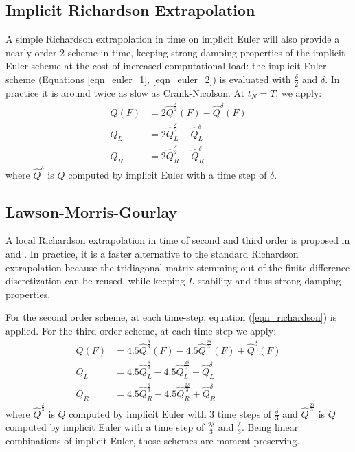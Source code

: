 \documentclass[]{rAMF2e}
\begin{document}
\subsection{Implicit Richardson Extrapolation}
A simple Richardson extrapolation in time \citep{richardson1911approximate} on implicit Euler will also provide a nearly order-2 scheme in time, keeping strong damping properties of the implicit Euler scheme at the cost of increased computational load: the implicit Euler scheme (Equations \ref{eqn_euler_1}, \ref{eqn_euler_2}) is evaluated with $\frac{\delta}{2}$ and $\delta$. In practice it is around twice as slow as Crank-Nicolson. At $t_N=T$, we apply:
\begin{align}\label{eqn_richardson}
Q(F) &= 2 \hat{Q}^{\frac{\delta}{2}}(F) - \hat{Q}^{\delta}(F) \\
Q_L &= 2 \hat{Q}^{\frac{\delta}{2}}_L - \hat{Q}^{\delta}_L\\
Q_R &= 2 \hat{Q}^{\frac{\delta}{2}}_R - \hat{Q}^{\delta}_R
\end{align}
where $\hat{Q}^{\delta}$ is $Q$ computed by implicit Euler with a time step of $\delta$.


\subsection{Lawson-Morris-Gourlay}
A local Richardson extrapolation in time of second and third order is proposed in \citep{lawson1978extrapolation} and \citep{gourlay1980extrapolation}. In practice, it is a faster alternative to the standard Richardson extrapolation because the tridiagonal matrix stemming out of the finite difference discretization can be reused, while keeping $L$-stability and thus strong damping properties.

For the second order scheme, at each time-step, equation (\ref{eqn_richardson}) is applied.
For the third order scheme, at each time-step we apply:
\begin{align}\label{eqn_lmg3}
Q(F) &= 4.5 \hat{Q}^{\frac{\delta}{3}}(F) - 4.5 \hat{Q}^{\frac{2\delta}{3}}(F)  + \hat{Q}^{\delta}(F)\\
Q_L &= 4.5 \hat{Q}^{\frac{\delta}{3}}_L - 4.5 \hat{Q}^{\frac{2\delta}{3}}_L  + \hat{Q}^{\delta}_L\\
Q_R &= 4.5 \hat{Q}^{\frac{\delta}{3}}_R - 4.5 \hat{Q}^{\frac{2\delta}{3}}_R  + \hat{Q}^{\delta}_R
\end{align}
where $\hat{Q}^{\frac{\delta}{3}}$ is $Q$ computed by implicit Euler with 3 time steps of $\frac{\delta}{3}$ and $\hat{Q}^{\frac{2\delta}{3}}$ is $Q$ computed by implicit Euler with a time step of $\frac{2\delta}{3}$ and $\frac{\delta}{3}$. Being linear combinations of implicit Euler, those schemes are moment preserving.
\end{document}

